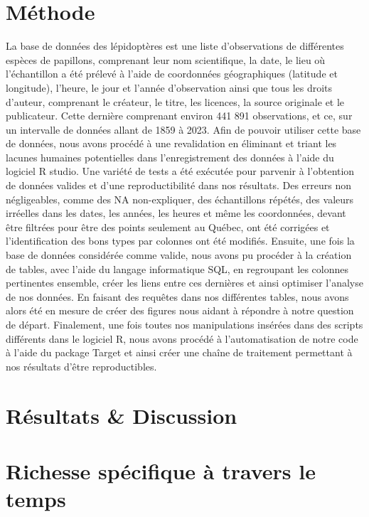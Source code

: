 \documentclass[9pt,twocolumn,twoside,]{pnas-new}
\begin{document}
\section*{Méthode}\label{muxe9thode}

La base de données des lépidoptères est une liste d'observations de
différentes espèces de papillons, comprenant leur nom scientifique, la
date, le lieu où l'échantillon a été prélevé à l'aide de coordonnées
géographiques (latitude et longitude), l'heure, le jour et l'année
d'observation ainsi que tous les droits d'auteur, comprenant le
créateur, le titre, les licences, la source originale et le publicateur.
Cette dernière comprenant environ 441 891 observations, et ce, sur un
intervalle de données allant de 1859 à 2023. Afin de pouvoir utiliser
cette base de données, nous avons procédé à une revalidation en
éliminant et triant les lacunes humaines potentielles dans
l'enregistrement des données à l'aide du logiciel R studio. Une variété
de tests a été exécutée pour parvenir à l'obtention de données valides
et d'une reproductibilité dans nos résultats. Des erreurs non
négligeables, comme des NA non-expliquer, des échantillons répétés, des
valeurs irréelles dans les dates, les années, les heures et même les
coordonnées, devant être filtrées pour être des points seulement au
Québec, ont été corrigées et l'identification des bons types par
colonnes ont été modifiés. Ensuite, une fois la base de données
considérée comme valide, nous avons pu procéder à la création de tables,
avec l'aide du langage informatique SQL, en regroupant les colonnes
pertinentes ensemble, créer les liens entre ces dernières et ainsi
optimiser l'analyse de nos données. En faisant des requêtes dans nos
différentes tables, nous avons alors été en mesure de créer des figures
nous aidant à répondre à notre question de départ. Finalement, une fois
toutes nos manipulations insérées dans des scripts différents dans le
logiciel R, nous avons procédé à l'automatisation de notre code à l'aide
du package Target et ainsi créer une chaîne de traitement permettant à
nos résultats d'être reproductibles.

\section*{Résultats \& Discussion}\label{ruxe9sultats-discussion}

\section*{Richesse spécifique à travers le
temps}\label{richesse-spuxe9cifique-uxe0-travers-le-temps}
\end{document}
